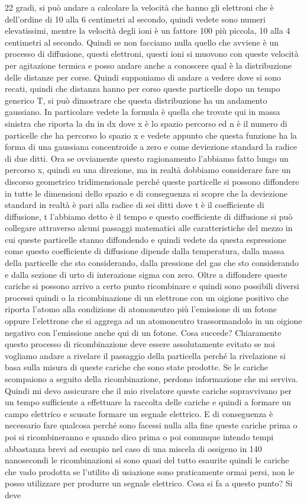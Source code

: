 22 gradi, si può andare a calcolare la velocità che hanno gli elettroni che è dell'ordine di 10 alla 6 centimetri al secondo, quindi vedete sono numeri elevatissimi, mentre la velocità degli ioni è un fattore 100 più piccola, 10 alla 4 centimetri al secondo. Quindi se non facciamo nulla quello che avviene è un processo di diffusione, questi elettroni, questi ioni si muovono con queste velocità per agitazione termica e posso andare anche a conoscere qual è la distribuzione delle distanze per corse. Quindi supponiamo di andare a vedere dove si sono recati, quindi che distanza hanno per corso queste particelle dopo un tempo generico T, si può dimostrare che questa distribuzione ha un andamento gaussiano. In particolare vedete la formula è quella che trovate qui in massa sinistra che riporta la dn in dx dove x è lo spazio percorso ed n è il numero di particelle che ha percorso lo spazio x e vedete appunto che questa funzione ha la forma di una gaussiana concentroide a zero e come deviezione standard la radice di due ditti. Ora se ovviamente questo ragionamento l'abbiamo fatto lungo un percorso x, quindi su una direzione, ma in realtà dobbiamo considerare fare un discorso geometrico tridimensionale perché queste particelle si possono diffondere in tutte le dimensioni dello spazio e di conseguenza si scopre che la deviezione standard in realtà è pari alla radice di sei ditti dove t è il coefficiente di diffusione, t l'abbiamo detto è il tempo e questo coefficiente di diffusione si può collegare attraverso alcuni passaggi matematici alle caratteristiche del mezzo in cui queste particelle stanno diffondendo e quindi vedete da questa espressione come questo coefficiente di diffusione dipende dalla temperatura, dalla massa della particelle che sto considerando, dalla pressione del gas che sto considerando e dalla sezione di urto di interazione sigma con zero. Oltre a diffondere queste cariche si possono arrivo a certo punto ricombinare e quindi sono possibili diversi processi quindi o la ricombinazione di un elettrone con un oigione positivo che riporta l'atomo alla condizione di atomoneutro più l'emissione di un fotone oppure l'elettrone che si aggrega ad un atomoneutro trassormandolo in un oigione negativo con l'emissione anche qui di un fotone. Cosa succede? Chiaramente questo processo di ricombinazione deve essere assolutamente evitato se noi vogliamo andare a rivelare il passaggio della particella perché la rivelazione si basa sulla misura di queste cariche che sono state prodotte. Se le cariche scompaiono a seguito della ricombinazione, perdono informazione che mi serviva. Quindi mi devo assicurare che il mio rivelatore queste cariche sopravvivano per un tempo sufficiente a effettuare la raccolta delle cariche e quindi a formare un campo elettrico e scusate formare un segnale elettrico. E di conseguenza è necessario fare qualcosa perché sono facessi nulla alla fine queste cariche prima o poi si ricombineranno e quando dico prima o poi comunque intendo tempi abbastanza brevi ad esempio nel caso di una miscela di ossigeno in 140 nanosecondi le ricombinazioni si sono quasi del tutto esaurite quindi le cariche che vado prodotta se l'utilito di usiazione sono praticamente ormai persi, non le posso utilizzare per produrre un segnale elettrico. Cosa si fa a questo punto? Si deve 
